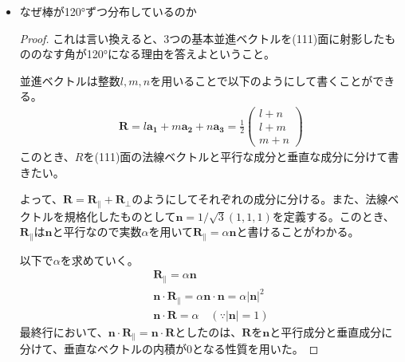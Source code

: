 \documentclass[a4paper,11pt,dvipdfmx]{jsarticle}
\begin{document}
\begin{enumerate}
\begin{itemize}
\begin{proof}
          \begin{align*}
            \cos \theta = \frac{ \boldsymbol{a \cdot b} }{| \boldsymbol{a} | | \boldsymbol{b} |} = \cfrac{a}{\cfrac{a}{\sqrt{2}} \sqrt{3}} = \sqrt{\frac{2}{3}} \quad \therefore \theta \simeq 35.26 \mathrm{deg}
          \end{align*}
          となることがわかる。
        \end{proof}
        \item なぜ棒が120°ずつ分布しているのか
          \begin{proof}
            これは言い換えると、3つの基本並進ベクトルを(111)面に射影したもののなす角が120°になる理由を答えよということ。
            
            並進ベクトルは整数$l, m, n$を用いることで以下のようにして書くことができる。
            \begin{align*}
              \boldsymbol{R} = l \boldsymbol{a_1} + m \boldsymbol{a_2} + n \boldsymbol{a_3} = \frac{1}{2}
              \begin{pmatrix}
                l + n \\
                l + m \\
                m + n
              \end{pmatrix}
            \end{align*}
            このとき、$R$を(111)面の法線ベクトルと平行な成分と垂直な成分に分けて書きたい。

            よって、$\boldsymbol{R} = \boldsymbol{R}_{\parallel} + \boldsymbol{R}_{\perp}$のようにしてそれぞれの成分に分ける。また、法線ベクトルを規格化したものとして$\boldsymbol{n} = 1 / \sqrt{3} (1, 1, 1)$を定義する。このとき、$\boldsymbol{R}_{\parallel}$は$\boldsymbol{n}$と平行なので実数$\alpha$を用いて$\boldsymbol{R}_{\parallel} = \alpha \boldsymbol{n}$と書けることがわかる。

            以下で$\alpha$を求めていく。
            \begin{gather*}
              \boldsymbol{R}_{\parallel} = \alpha \boldsymbol{n} \\
              \boldsymbol{n} \cdot \boldsymbol{R}_{\parallel} = \alpha \boldsymbol{n} \cdot \boldsymbol{n} = \alpha |\boldsymbol{n}|^2  \\
              \boldsymbol{n} \cdot \boldsymbol{R} = \alpha \quad ( \because |\boldsymbol{n}| = 1 )
            \end{gather*}
            最終行において、$\boldsymbol{n} \cdot \boldsymbol{R}_{\parallel} = \boldsymbol{n} \cdot \boldsymbol{R}$としたのは、$\boldsymbol{R}$を$\boldsymbol{n}$と平行成分と垂直成分に分けて、垂直なベクトルの内積が0となる性質を用いた。


\end{proof}
\end{itemize}
\end{enumerate}
\end{document}
